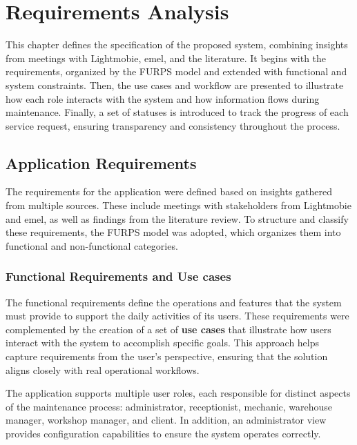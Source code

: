 \chapter{Requirements Analysis}%
\label{chapter:requirementsAnalysis}

\begin{introduction}
This chapter defines the specification of the proposed system, combining insights from meetings with Lightmobie, \acs{emel}, and the literature. It begins with the requirements, organized by the FURPS model and extended with functional and system constraints. Then, the use cases and workflow are presented to illustrate how each role interacts with the system and how information flows during maintenance. Finally, a set of statuses is introduced to track the progress of each service request, ensuring transparency and consistency throughout the process.
\end{introduction} 




\section{Application Requirements}
The requirements for the application were defined based on insights gathered from multiple sources. These include meetings with stakeholders from Lightmobie and \acs{emel}, as well as findings from the literature review. To structure and classify these requirements, the FURPS model was adopted, which organizes them into functional and non-functional categories. ~\cite{furps, furps2} 

\subsection{Functional Requirements and Use cases}
The functional requirements define the operations and features that the system must provide to support the daily activities of its users. These requirements were complemented by the creation of a set of \textbf{use cases} that illustrate how users interact with the system to accomplish specific goals. This approach helps capture requirements from the user’s perspective, ensuring that the solution aligns closely with real operational workflows.

The application supports multiple user roles, each responsible for distinct aspects of the maintenance process: administrator, receptionist, mechanic, warehouse manager, workshop manager, and client. In addition, an administrator view provides configuration capabilities to ensure the system operates correctly.


